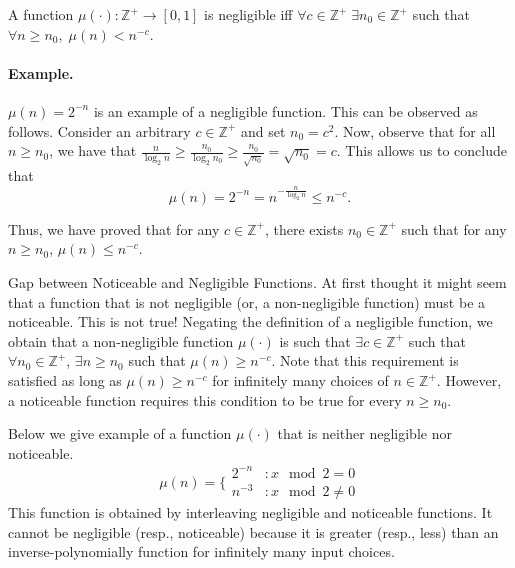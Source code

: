 \begin{tcolorbox}[colback=red!5!white]
\begin{definition}
A function $\mu(\cdot): \mathbb{Z}^+ \rightarrow [0,1]$ is negligible iff $\forall c \in \mathbb{Z}^+ \; \exists n_0 \in \mathbb{Z}^+$ such that $\forall n \geq n_0 , \; \mu(n) < n^{-c}$.
\end{definition}
\end{tcolorbox}

\paragraph{Example.} $\mu(n) = 2^{-n}$ is an example of a negligible function. This can be observed as follows.
Consider an arbitrary $c \in \mathbb{Z}^+$ and set $n_0 = c^2$. Now, observe that for all $n \geq n_0$, we have that $\frac{n}{\log_2 n} \geq \frac{n_0}{\log_2 n_0} \geq \frac{n_0}{\sqrt{n_0}} = \sqrt{n_0} = c$. This allows us to conclude that $$\mu(n) = 2^{-n} = n^{-\frac{n}{\log_2 n}} \leq n^{-c}.$$

Thus, we have proved that for any $c \in \mathbb{Z}^+$, there exists $n_0 \in \mathbb{Z}^+$ such that for any $n \geq n_0$, $\mu(n) \leq n^{-c}$.

\begin{remark}{Gap between Noticeable and Negligible Functions.}
At first thought it might seem that a function that is {not} negligible (or, a non-negligible function) must be a noticeable. This is not true! Negating the definition of a negligible function, we obtain that a non-negligible function $\mu(\cdot)$ is such that $\exists c \in \mathbb{Z}^+$ such that $\forall n_0 \in \mathbb{Z}^+$, $\exists n \geq n_0$ such that $\mu(n) \geq n^{-c}$.
Note that this requirement is satisfied as long as $\mu(n) \geq n^{-c}$ for infinitely many choices of $n \in \mathbb{Z}^+$. However, a noticeable function requires this condition to be true for every $n \geq n_0$.

Below we give example of a function $\mu(\cdot)$ that is neither negligible nor noticeable.
$$\mu(n) = \Big\{
\begin{array}{ll}
  2^{-n} & : x \mod 2 = 0\\
  n^{-3} & : x \mod 2 \neq 0
\end{array}
$$
This function is obtained by interleaving negligible and  noticeable functions. It cannot be negligible (resp., noticeable) because it is greater (resp., less) than an inverse-polynomially function for infinitely many input choices.
\end{remark}

